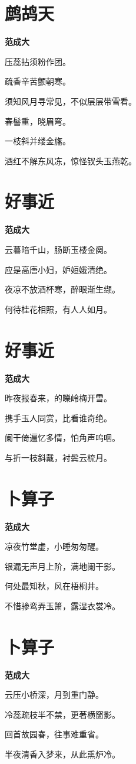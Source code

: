 \documentclass[12pt,a4paper]{ctexbook}
\begin{document}
\section{鹧鸪天}
\textbf{范成大}\par\vspace{0.5em}
压蕊拈须粉作团。\par
疏香辛苦颤朝寒。\par
须知风月寻常见，不似层层带雪看。\par
春髻重，晓眉弯。\par
一枝斜并缕金旛。\par
酒红不解东风冻，惊怪钗头玉燕乾。\par

\section{好事近}
\textbf{范成大}\par\vspace{0.5em}
云暮暗千山，肠断玉楼金阕。\par
应是高唐小妇，妒姮娥清绝。\par
夜凉不放酒杯寒，醉眼渐生缬。\par
何待桂花相照，有人人如月。\par

\section{好事近}
\textbf{范成大}\par\vspace{0.5em}
昨夜报春来，的皪岭梅开雪。\par
携手玉人同赏，比看谁奇绝。\par
阑干倚遍忆多情，怕角声呜咽。\par
与折一枝斜戴，衬鬓云梳月。\par

\section{卜算子}
\textbf{范成大}\par\vspace{0.5em}
凉夜竹堂虚，小睡匆匆醒。\par
银漏无声月上阶，满地阑干影。\par
何处最知秋，风在梧桐井。\par
不惜骖鸾弄玉箫，露湿衣裳冷。\par

\section{卜算子}
\textbf{范成大}\par\vspace{0.5em}
云压小桥深，月到重门静。\par
冷蕊疏枝半不禁，更著横窗影。\par
回首故园春，往事难重省。\par
半夜清香入梦来，从此熏炉冷。\par
\end{document}
